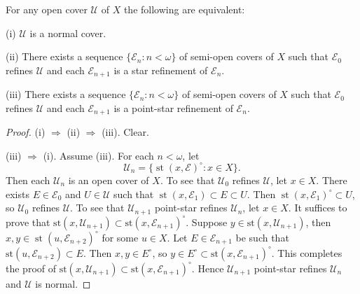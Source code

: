 \documentclass[main.tex]{subfiles}
\begin{document}
{\theorem{\label{th:5.1.2}}
 For any open cover \(\mathscr{U}\) of \(X\) the following
are equivalent:

\textup{(i)} \(\mathscr{U}\) is a normal cover.

\textup{(ii)} There exists a sequence $\{\mathscr{E}_n: n < \omega\}$ of semi-open covers of $X$ 
such that $\mathscr{E}_0$ refines $\mathscr{U}$ and each $\mathscr{E}_{n+1}$ is 
a star refinement of $\mathscr{E}_n$.

\textup{(iii)} There exists a sequence $\{\mathscr{E}_n: n < \omega\}$ of semi-open covers of $X$ 
such that $\mathscr{E}_0$ refines $\mathscr{U}$ and each $\mathscr{E}_{n+1}$ is 
a point-star refinement of $\mathscr{E}_n$.
}

\begin{proof}
 (i) $\Rightarrow$ (ii) $\Rightarrow$ (iii). Clear.

(iii) $\Rightarrow$ (i). Assume (iii). For each $n < \omega$, let 
$$\mathscr{U}_n = \{\operatorname{st}(x, \mathscr{E})^{\circ}: x \in X\}.$$
Then each $\mathscr{U}_n$ is an open cover of $X$. To see that $\mathscr{U}_0$ refines $\mathscr{U}$, let $x \in X$. There exists $E \in \mathscr{E}_0$ and 
$U \in \mathscr{U}$ such that $\operatorname{st}(x, \mathscr{E}_1) \subset E \subset U$. 
Then $\operatorname{st}(x, \mathscr{E}_1)^{\circ} \subset U$, 
so $\mathscr{U}_0$ refines $\mathscr{U}$.
To see that $\mathscr{U}_{n+1}$ point-star refines $\mathscr{U}_n$, let $x \in X$. 
It suffices to prove that 
$\mathrm{st}(x, \mathscr{U}_{n+1}) \subset \mathrm{st}(x, \mathscr{E}_{n+1})^{\circ}$. 
Suppose $y \in \mathrm{st}(x, \mathscr{U}_{n+1})$, then 
$x, y \in \operatorname{st}(u, \mathscr{E}_{n+2})^{\circ}$ 
for some $u \in X$. Let $E \in \mathscr{E}_{n+1}$ be such that 
$\mathrm{st}(u, \mathscr{E}_{n+2}) \subset E$. Then $x, y \in E^\circ$, so 
$y \in E^{\circ} \subset \mathrm{st}(x, \mathscr{E}_{n+1})^{\circ}$. 
This completes the proof of 
$\mathrm{st}(x, \mathscr{U}_{n+1}) \subset \mathrm{st}(x, \mathscr{E}_{n+1})^{\circ}$. 
Hence $\mathscr{U}_{n+1}$ point-star refines $\mathscr{U}_n$ and  $\mathscr{U}$ is normal.
\end{proof}
\end{document}
